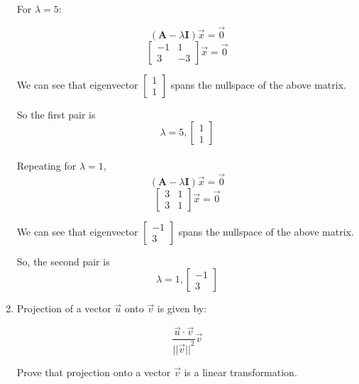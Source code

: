 \begin{enumerate}
{    For $\lambda = 5$:
    
    $$
    (\mathbf{A} - \lambda \mathbf{I})\vec{x} = \vec{0}
    $$
    $$\begin{bmatrix}
    -1 & 1 \\
    3 & -3
    \end{bmatrix}\vec{x} = \vec{0}$$
    
    We can see that eigenvector $\begin{bmatrix} 1 \\ 1 \end{bmatrix}$ spans the nullspace of the above matrix.

    So the first pair is $$\lambda = 5, \begin{bmatrix} 
    1 \\
    1
    \end{bmatrix}$$ \\

    Repeating for $\lambda = 1$,
    $$
    (\mathbf{A} - \lambda \mathbf{I})\vec{x} = \vec{0}
    $$ 
    $$\begin{bmatrix}
    3 & 1 \\
    3 & 1
    \end{bmatrix}\vec{x} = \vec{0}$$
    
    We can see that eigenvector $\begin{bmatrix} -1 \\ 3 \end{bmatrix}$ spans the nullspace of the above matrix.
    
    So, the second pair is
    $$\lambda = 1, 
    \begin{bmatrix} 
    -1 \\
    3
    \end{bmatrix}$$
    }

\item{
    Projection of a vector $\vec{u}$ onto $\vec{v}$ is given by:

    $$\frac{\vec{u} \cdot \vec{v}}{{||\vec{v}||}^2} \vec{v}$$

    Prove that projection onto a vector $\vec{v}$ is a linear transformation.
}


\answerbox{7cm}

\end{enumerate}
